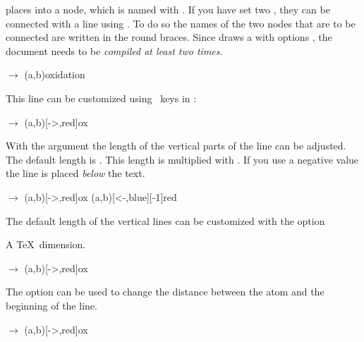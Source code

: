 \documentclass{chemmacros-manual}
\begin{document}
 places  into a node, which is named with .  If
you have set two , they can be connected with a line using .
To do so the names of the two nodes that are to be connected are written in
the round braces.  Since  draws a  with options
, the document needs to be \emph{compiled at
  least two times}.

\begin{example}
  \vspace{7mm}
   $\rightarrow$ \pch\redox(a,b){oxidation}
\end{example}

This line can be customized using \TikZ\ keys in :
\begin{example}
  \vspace{7mm}
   $\rightarrow$ \pch\redox(a,b)[->,red]{ox}
\end{example}

With the argument  the length of the vertical parts of the line can
be adjusted.  The default length is \code{.6em}.  This length is multiplied
with .  If you use a negative value the line is placed \emph{below}
the text.
\begin{example}
  \vspace{7mm}
   $\rightarrow$ \pch
  \redox(a,b)[->,red]{ox}
  \redox(a,b)[<-,blue][-1]{red}
  \vspace{7mm}
\end{example}

The default length of the vertical lines can be customized with the option
\begin{options}
  \Initial{.6em}
    A \TeX\ dimension.
\end{options}

\begin{example}
  \vspace{7mm}
   $\rightarrow$ \pch\redox(a,b)[->,red]{ox}
\end{example}

\begin{options}
  \Initial{.2em}
    The option can be used to change the distance between the atom and the
    beginning of the line.
\end{options}

\begin{example}
  \vspace{7mm}
   $\rightarrow$ \pch\redox(a,b)[->,red]{ox}
\end{example}
\end{document}
